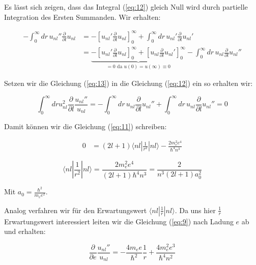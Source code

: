 Es lässt sich zeigen, dass das Integral (\ref{eq:12}) gleich Null wird durch partielle Integration des Ersten Summanden. Wir erhalten:


\begin{align}
  \label{eq:13}
   - \int_0^{\infty}dr\, u_{nl}'' \frac{\partial}{\partial l} u_{nl} &= -\left[  u_{nl}'\frac{\partial}{\partial l} u_{nl}\right]_0^\infty + \int_0^{\infty}dr\, u_{nl}' \frac{\partial}{\partial l} u_{nl}'\\
 &= \underbrace{-\left[  u_{nl}'\frac{\partial}{\partial l} u_{nl}\right]_0^\infty + \left[  u_{nl}\frac{\partial}{\partial l} u_{nl}'\right]_0^\infty}_{=0 \text{ da } u(0)=u(\infty)\equiv 0} - \int_0^{\infty}dr\, u_{nl} \frac{\partial}{\partial l} u_{nl}''
\end{align}

Setzen wir die Gleichung (\ref{eq:13}) in die Gleichung (\ref{eq:12}) ein so erhalten wir:

\begin{equation}
  \label{eq:14}
   \int_0^{\infty}dr u_{nl}^2 \frac{\partial}{\partial l}\frac{u_{nl}''}{u_{nl}}=  - \int_0^{\infty}dr\, u_{nl} \frac{\partial}{\partial l} u_{nl}''  +\int_0^{\infty}dr\,  u_{nl} \frac{\partial}{\partial l}u_{nl}'' = 0
\end{equation}



Damit können wir die Gleichung (\ref{eq:11}) schreiben:

\begin{align}
  \label{eq:15}
  0 &=(2l+1)\langle nl|\frac{1}{r^2}|nl\rangle   -\frac{2 m_e^2e^4}{\hbar^4 n^3}
\end{align}

\begin{equation}
  \label{eq:16}
  \boxed{\langle nl|\frac{1}{r^2}|nl\rangle = \frac{2 m_e^2e^4}{(2l+1)\hbar^4 n^3}=\frac{2}{n^3(2l+1)a_0^2} }
\end{equation}

Mit \(a_0=\frac{\hbar^2}{m_e e^2}\).

Analog verfahren wir für den Erwartungswert \(\langle nl| \frac{1}{r}|nl \rangle \). Da uns hier \(\frac{1}{r}\) Erwartungswert interessiert leiten wir die Gleichung (\ref{eq:9}) nach Ladung \(e\) ab und erhalten:

\begin{equation}
  \label{eq:17}
   \frac{\partial}{\partial e}\frac{u_{nl}''}{u_{nl}} = - \frac{4m_e e}{\hbar^2}\frac{1}{r}+\frac{4m_e^2e^3}{\hbar^4 n^2}
\end{equation}

